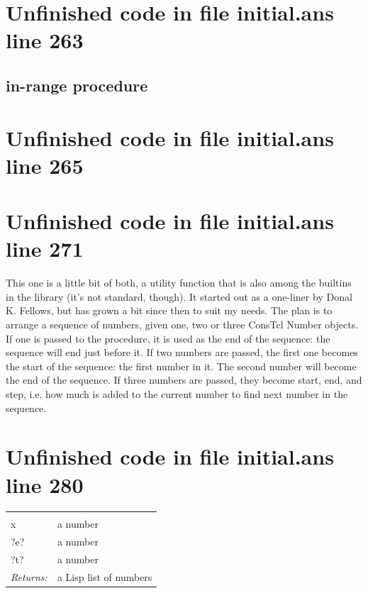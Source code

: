 \documentclass[twoside,9pt]{report}
\begin{document}
\section{Unfinished code in file initial.ans line 263}
\subsection{in-range procedure}
\label{in-range-procedure}
\section{Unfinished code in file initial.ans line 265}

\section{Unfinished code in file initial.ans line 271}

This one is a little bit of both, a utility function that is also among the builtins in the library (it's not standard, though). It started out as a one-liner by Donal K. Fellows, but has grown a bit since then to suit my needs. The plan is to arrange a sequence of numbers, given one, two or three ConsTcl Number objects. If one is passed to the procedure, it is used as the end of the sequence: the sequence will end just before it. If two numbers are passed, the first one becomes the start of the sequence: the first number in it. The second number will become the end of the sequence. If three numbers are passed, they become start, end, and step, i.e. how much is added to the current number to find next number in the sequence.

\section{Unfinished code in file initial.ans line 280}
\noindent\begin{tabular}{ |p{1.9cm} p{8cm}| }
\hline
\rowcolor[HTML]{CCCCCC} \multicolumn{2}{|l|}{\bf in-range (public)} \\
x & a number \\
?e? & a number \\
?t? & a number \\
\textit{Returns:} & a Lisp list of numbers \\
\hline
\end{tabular}
\end{document}
